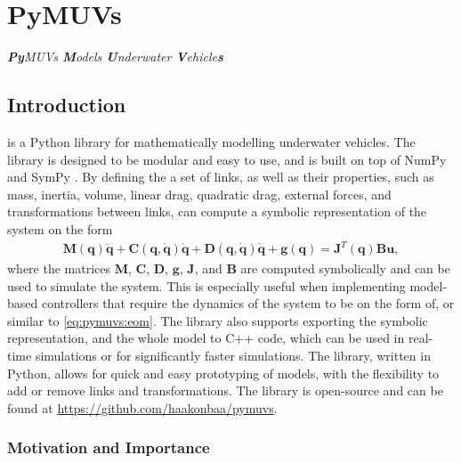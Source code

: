 \chapter{PyMUVs}
\emph{\textbf{Py}MUVs \textbf{M}odels \textbf{U}nderwater \textbf{V}ehicle\textbf{s}}

\section{Introduction}

\pymuvs{ }is a Python library for mathematically modelling underwater vehicles. The
library is designed to be modular and easy to use, and is built on top of NumPy
\cite{numpy} and SymPy \cite{sympy}. By defining the a set of links, as well as
their properties, such as mass, inertia, volume, linear drag, quadratic drag,
external forces, and transformations between links,
\pymuvs{ }can compute a symbolic representation of the system on the
form
\begin{align}
    \bm{M}(\bm{q}) \ddot{\bm{q}} + \bm{C}(\bm{q}, \dot{\bm{q}}) \dot{\bm{q}} +
    \bm{D}(\bm{q}, \dot{\bm{q}}) \dot{\bm{q}} + \bm{g}(\bm{q}) = \bm{J}^T(\bm{q}) \bm{B} \bm{u},
    \label{eq:pymuvs:eom}
\end{align}
where the matrices $\bm{M}$, $\bm{C}$, $\bm{D}$, $\bm{g}$, $\bm{J}$, and $\bm{B}$ are
computed symbolically and can be used to simulate the system. This is especially
useful when implementing model-based controllers that require the dynamics of the
system to be on the form of, or similar to \autoref{eq:pymuvs:eom}. The library
also supports exporting the symbolic representation, and the whole model to C++
code, which can be used in real-time simulations or for significantly faster
simulations.
The library, written in Python, allows for quick and easy prototyping of
models, with the flexibility to add or remove links and transformations.
The library is open-source and can be found at
\url{https://github.com/haakonbaa/pymuvs}. 


\subsection{Motivation and Importance}

